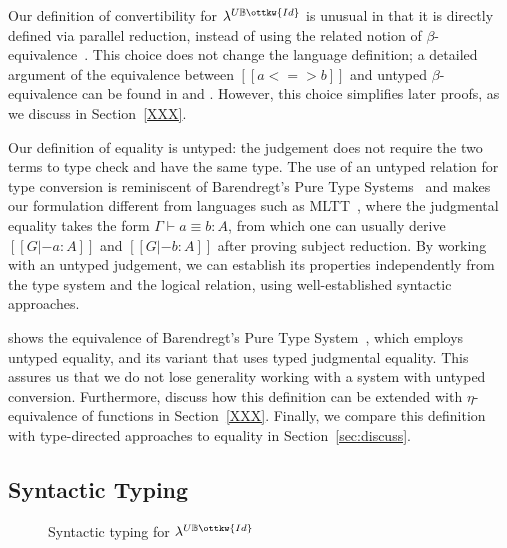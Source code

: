 \documentclass[acmsmall,screen=true,
\ifpublic review=false\else,review=true\fi
  ,anonymous=\ifanonymous true\else false\fi]{acmart}
\newcommand{\lang}{$\lambda^{U\mathbb{B}\ottkw{Id}}$\xspace}
\newcommand{\scw}[1]{}
\begin{document}
Our definition of convertibility for \lang{} is unusual in that it is directly
defined via parallel reduction, instead of using the related notion of
$\beta$-equivalence~\cite{barendregt:pts,cic}. This choice does not change the
language definition; a detailed argument of the equivalence between
$[[a <=> b]]$ and untyped $\beta$-equivalence can be found in
\citet{barendregt:lambda-calculi-with-types} and
\citet{takahashi-parallel-reduction}. However, this choice simplifies later
proofs, as we discuss in Section~\ref{XXX}. \scw{Forward reference to further
  discussion, comparing with whnf reduction?}

Our definition of equality is untyped: the judgement does not require the two
terms to type check and have the same type. The use of an untyped relation for
type conversion is reminiscent of Barendregt's Pure Type
Systems~\citet{barendregt1991introduction} and makes our formulation different
from languages such as MLTT~\citep{Martin-Lof-1973}, where the judgmental
equality takes the form $\Gamma \vdash a \equiv b : A$, from which one can
usually derive $[[G |- a : A]]$ and $[[G |- b : A]]$ after proving subject
reduction. By working with an untyped judgement, we can establish its
properties independently from the type system and the logical relation, using
well-established syntactic approaches.

\citet{siles2012pure} shows the equivalence of Barendregt's Pure Type
System~\citep{barendregt1991introduction}, which employs untyped equality, and
its variant that uses typed judgmental equality. This assures us that we do
not lose generality working with a system with untyped
conversion. Furthermore, discuss how this definition can be extended with
$\eta$-equivalence of functions in Section~\ref{XXX}. Finally, we compare this
definition with type-directed approaches to equality in
Section~\ref{sec:discuss}.


\subsection{Syntactic Typing}

\begin{figure}[h]
\begin{minipage}{0.9\textwidth}
\end{minipage}
\caption{Syntactic typing for \lang}
\label{fig:typing}
\end{figure}
\end{document}
